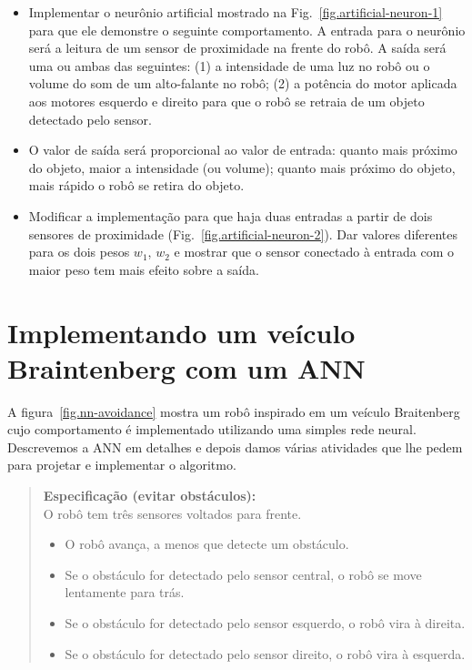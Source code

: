 \begin{framed}
\begin{itemize}
\item Implementar o neurônio artificial mostrado na Fig.~\ref{fig.artificial-neuron-1} para que ele demonstre o seguinte comportamento. A entrada para o neurônio será a leitura de um sensor de proximidade na frente do robô. A saída será uma ou ambas das seguintes: (1) a intensidade de uma luz no robô ou o volume do som de um alto-falante no robô; (2) a potência do motor aplicada aos motores esquerdo e direito para que o robô se retraia de um objeto detectado pelo sensor.
\item O valor de saída será proporcional ao valor de entrada: quanto mais próximo do objeto, maior a intensidade (ou volume); quanto mais próximo do objeto, mais rápido o robô se retira do objeto.
\item Modificar a implementação para que haja duas entradas a partir de dois sensores de proximidade (Fig.~\ref{fig.artificial-neuron-2}). Dar valores diferentes para os dois pesos $w_1$, $w_2$ e mostrar que o sensor conectado à entrada com o maior peso tem mais efeito sobre a saída.
\end{itemize}
\end{framed}


\section{Implementando um veículo Braintenberg com um ANN}\label{s.braitenberg-ann}

A figura~\ref{fig.nn-avoidance} mostra um robô inspirado em um veículo Braitenberg cujo comportamento é implementado utilizando uma simples rede neural. Descrevemos a ANN em detalhes e depois damos várias atividades que lhe pedem para projetar e implementar o algoritmo.

\begin{quote}
\normalsize
\noindent\textbf{Especificação (evitar obstáculos):}\\
O robô tem três sensores voltados para frente.
\begin{itemize}
\item O robô avança, a menos que detecte um obstáculo.
\item Se o obstáculo for detectado pelo sensor central, o robô se move lentamente para trás.
\item Se o obstáculo for detectado pelo sensor esquerdo, o robô vira à direita.
\item Se o obstáculo for detectado pelo sensor direito, o robô vira à esquerda.
\end{itemize}
\end{quote}

